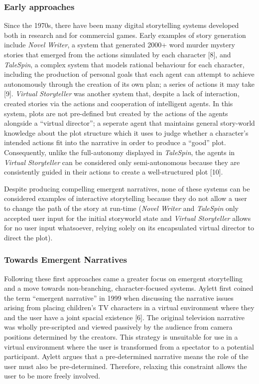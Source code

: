 \documentclass{sig-alternate-05-2015}
\begin{document}
\subsubsection{Early approaches}
Since the 1970s, there have been many digital storytelling systems developed both in research and for commercial games. Early examples of story generation include \textit{Novel Writer}, a system that generated 2000+ word murder mystery stories that emerged from the actions simulated by each character [8], and \textit{TaleSpin}, a complex system that models rational behaviour for each character, including the production of personal goals that each agent can attempt to achieve autonomously through the creation of its own plan; a series of actions it may take [9]. \textit{Virtual Storyteller} was another system that, despite a lack of interaction, created stories via the actions and cooperation of intelligent agents. In this system, plots are not pre-defined but created by the actions of the agents alongside a ``virtual director''; a seperate agent that maintains general story-world knowledge about the plot structure which it uses to judge whether a character's intended actions fit into the narrative in order to produce a ``good'' plot. Consequently, unlike the full-autonomy displayed in \textit{TaleSpin}, the agents in \textit{Virtual Storyteller} can be considered only semi-autonomous because they are consistently guided in their actions to create a well-structured plot [10]. 

Despite producing compelling emergent narratives, none of these systems can be considered examples of interactive storytelling because they do not allow a user to change the path of the story at run-time (\textit{Novel Writer} and \textit{TaleSpin} only accepted user input for the initial storyworld state and \textit{Virtual Storyteller} allows for no user input whatsoever, relying solely on its encapsulated virtual director to direct the plot).\\

\subsubsection{Towards Emergent Narratives}

\noindent Following these first approaches came a greater focus on emergent storytelling and a move towards non-branching, character-focused systems. Aylett first coined the term ``emergent narrative'' in 1999 when discussing the narrative issues arising from placing children's TV characters in a virtual environment where they and the user have a joint spacial existence [6]. The original television narrative was wholly pre-scripted and viewed passively by the audience from camera positions determined by the creators. This strategy is unsuitable for use in a virtual environment where the user is transformed from a spectator to a potential participant. Aylett argues that a pre-determined narrative means the role of the user must also be pre-determined. Therefore, relaxing this constraint allows the user to be more freely involved.
\end{document}
